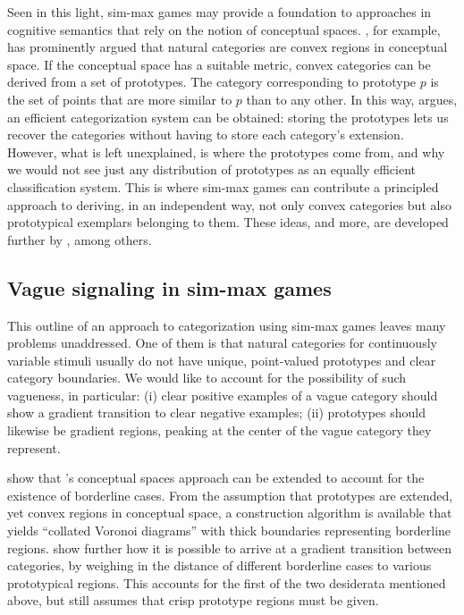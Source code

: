 \documentclass[fleqn,reqno,10pt]{article}
\begin{document}
Seen in this light, sim-max games may provide a foundation to
approaches in cognitive semantics that rely on the notion of
conceptual spaces.  \citet[][70--77]{Gardenfors2000:Conceptual-Spac},
for example, has prominently argued that natural categories are convex
regions in conceptual space. If the conceptual space has a suitable
metric, convex categories can be derived from a set of prototypes. The
category corresponding to prototype $p$ is the set of points that are
more similar to $p$ than to any other. In this way,
\citet{Gardenfors2000:Conceptual-Spac} argues, an efficient
categorization system can be obtained: storing the prototypes lets us
recover the categories without having to store each category's
extension. However, what is left unexplained, is where the prototypes
come from, and why we would not see just any distribution of
prototypes as an equally efficient classification system. This is
where sim-max games can contribute a principled approach to deriving,
in an independent way, not only convex categories but also
prototypical exemplars belonging to them.
These ideas, and more, are developed further by \citet{Jager2007:The-Evolution-o,JagerRooijvan-Rooij2007:Language-Struct,JagerMetzger2011:Voronoi-Languag,OConnor2014-OCOEPC}, among others.

\subsection{Vague signaling in sim-max games}

This outline of an approach to categorization using sim-max games
leaves many problems unaddressed. One of them is that natural
categories for continuously variable stimuli usually do not have
unique, point-valued prototypes and clear category boundaries. We
would like to account for the possibility of such vagueness, in
particular: (i) clear positive examples of a vague category should
show a gradient transition to clear negative examples;
(ii) prototypes should likewise be gradient regions, peaking at the
center of the vague category they represent.

\citet{DouvenDecock2011:Vagueness:-A-Co} show that
\citeauthor{Gardenfors2000:Conceptual-Spac}'s conceptual spaces
approach can be extended to account for the existence of borderline
cases. From the assumption that prototypes are extended, yet convex
regions in conceptual space, a construction algorithm is available
that yields ``collated Voronoi diagrams'' with thick boundaries
representing borderline
regions. \citet{DecockDouven2012:What-is-Graded-} show further how it
is possible to arrive at a gradient transition between categories, by
weighing in the distance of different borderline cases to various
prototypical regions. This accounts for the first of the two
desiderata mentioned above, but still assumes that crisp prototype
regions must be given.
\end{document}
